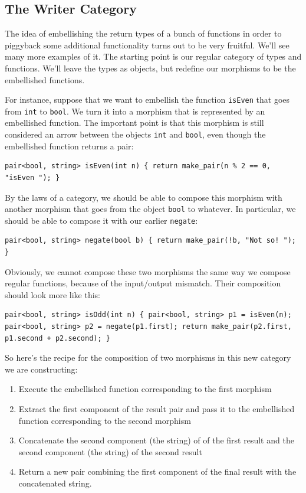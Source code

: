 \subsection{The Writer Category}\label{the-writer-category}

The idea of embellishing the return types of a bunch of functions in
order to piggyback some additional functionality turns out to be very
fruitful. We'll see many more examples of it. The starting point is our
regular category of types and functions. We'll leave the types as
objects, but redefine our morphisms to be the embellished functions.

For instance, suppose that we want to embellish the function
\texttt{isEven} that goes from \texttt{int} to \texttt{bool}. We turn it
into a morphism that is represented by an embellished function. The
important point is that this morphism is still considered an arrow
between the objects \texttt{int} and \texttt{bool}, even though the
embellished function returns a pair:

\begin{verbatim}
pair<bool, string> isEven(int n) { return make_pair(n % 2 == 0, "isEven "); }
\end{verbatim}

By the laws of a category, we should be able to compose this morphism
with another morphism that goes from the object \texttt{bool} to
whatever. In particular, we should be able to compose it with our
earlier \texttt{negate}:

\begin{verbatim}
pair<bool, string> negate(bool b) { return make_pair(!b, "Not so! "); }
\end{verbatim}

Obviously, we cannot compose these two morphisms the same way we compose
regular functions, because of the input/output mismatch. Their
composition should look more like this:

\begin{verbatim}
pair<bool, string> isOdd(int n) { pair<bool, string> p1 = isEven(n); pair<bool, string> p2 = negate(p1.first); return make_pair(p2.first, p1.second + p2.second); }
\end{verbatim}

So here's the recipe for the composition of two morphisms in this new
category we are constructing:

\begin{enumerate}
\tightlist
\item
  Execute the embellished function corresponding to the first morphism
\item
  Extract the first component of the result pair and pass it to the
  embellished function corresponding to the second morphism
\item
  Concatenate the second component (the string) of of the first result
  and the second component (the string) of the second result
\item
  Return a new pair combining the first component of the final result
  with the concatenated string.
\end{enumerate}

